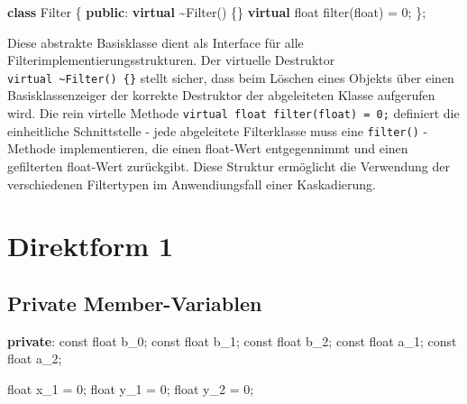 \documentclass[
  ngerman,
  letterpaper,
  DIV=11]{scrreprt}
\newenvironment{Shaded}{\begin{snugshade}}{\end{snugshade}}
\newcommand{\AttributeTok}[1]{\textcolor[rgb]{0.40,0.45,0.13}{#1}}
\newcommand{\DataTypeTok}[1]{\textcolor[rgb]{0.68,0.00,0.00}{#1}}
\newcommand{\DecValTok}[1]{\textcolor[rgb]{0.68,0.00,0.00}{#1}}
\newcommand{\KeywordTok}[1]{\textcolor[rgb]{0.00,0.23,0.31}{\textbf{#1}}}
\newcommand{\NormalTok}[1]{\textcolor[rgb]{0.00,0.23,0.31}{#1}}
\newcommand{\OperatorTok}[1]{\textcolor[rgb]{0.37,0.37,0.37}{#1}}
\begin{document}
\begin{Shaded}
\begin{Highlighting}[]
\KeywordTok{class}\NormalTok{ Filter}
  \OperatorTok{\{}
  \KeywordTok{public}\OperatorTok{:}
    \KeywordTok{virtual} \OperatorTok{\textasciitilde{}}\NormalTok{Filter}\OperatorTok{()} \OperatorTok{\{\}}
    \KeywordTok{virtual} \DataTypeTok{float}\NormalTok{ filter}\OperatorTok{(}\DataTypeTok{float}\OperatorTok{)} \OperatorTok{=} \DecValTok{0}\OperatorTok{;}
  \OperatorTok{\};}
\end{Highlighting}
\end{Shaded}

Diese abstrakte Basisklasse dient als Interface für alle
Filterimplementierungsstrukturen. Der virtuelle Destruktor
\texttt{virtual\ \textasciitilde{}Filter()\ \{\}} stellt sicher, dass
beim Löschen eines Objekts über einen Basisklassenzeiger der korrekte
Destruktor der abgeleiteten Klasse aufgerufen wird. Die rein virtelle
Methode \texttt{virtual\ float\ filter(float)\ =\ 0;} definiert die
einheitliche Schnittstelle - jede abgeleitete Filterklasse muss eine
\texttt{filter()} - Methode implementieren, die einen float-Wert
entgegennimmt und einen gefilterten float-Wert zurückgibt. Diese
Struktur ermöglicht die Verwendung der verschiedenen Filtertypen im
Anwendiungsfall einer Kaskadierung.

\section{Direktform 1}\label{direktform-1-1}

\subsection{Private Member-Variablen}\label{private-member-variablen}

\begin{Shaded}
\begin{Highlighting}[]
\KeywordTok{private}\OperatorTok{:}
  \AttributeTok{const} \DataTypeTok{float}\NormalTok{ b\_0}\OperatorTok{;} 
  \AttributeTok{const} \DataTypeTok{float}\NormalTok{ b\_1}\OperatorTok{;}
  \AttributeTok{const} \DataTypeTok{float}\NormalTok{ b\_2}\OperatorTok{;}
  \AttributeTok{const} \DataTypeTok{float}\NormalTok{ a\_1}\OperatorTok{;}
  \AttributeTok{const} \DataTypeTok{float}\NormalTok{ a\_2}\OperatorTok{;}

  \DataTypeTok{float}\NormalTok{ x\_1 }\OperatorTok{=} \DecValTok{0}\OperatorTok{;}
  \DataTypeTok{float}\NormalTok{ y\_1 }\OperatorTok{=} \DecValTok{0}\OperatorTok{;}
  \DataTypeTok{float}\NormalTok{ y\_2 }\OperatorTok{=} \DecValTok{0}\OperatorTok{;}
\end{Highlighting}
\end{Shaded}
\end{document}
